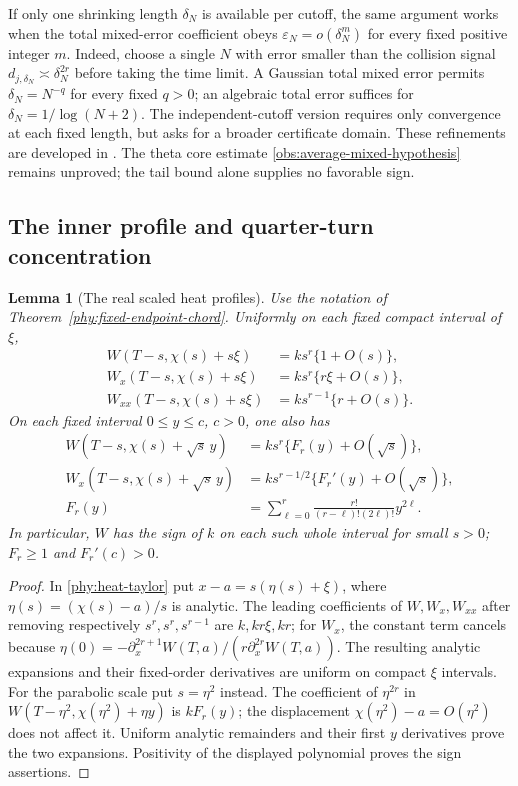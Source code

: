 \documentclass[11pt]{article}
\numberwithin{equation}{section}
\newtheorem{lemma}[theorem]{Lemma}
\theoremstyle{definition}
\theoremstyle{remark}
\begin{document}
If only one shrinking length $\delta_N$ is available per cutoff,
the same argument works when the total mixed-error coefficient obeys
$\varepsilon_N=o(\delta_N^m)$ for every fixed positive integer $m$.
Indeed, choose a single $N$ with error smaller than the collision
signal $d_{j,\delta_N}\asymp\delta_N^{2r}$ before taking the time
limit.  A Gaussian total mixed error permits $\delta_N=N^{-q}$ for
every fixed $q>0$; an algebraic total error suffices for
$\delta_N=1/\log(N+2)$.
The independent-cutoff version requires only convergence at each
fixed length, but asks for a broader certificate domain.
These refinements are developed in
\cite{ThetaFactorChord,ThetaExponential,ThetaResearchPaths}.
The theta core estimate \eqref{obs:average-mixed-hypothesis} remains
unproved; the tail bound alone supplies no favorable sign.

\subsection{The inner profile and quarter-turn concentration}

\begin{lemma}[The real scaled heat profiles]
\label{phy:scaled-profile}
Use the notation of Theorem~\ref{phy:fixed-endpoint-chord}.  Uniformly
on each fixed compact interval of $\xi$,
\begin{align}
 W(T-s,\chi(s)+s\xi)&=ks^r\{1+O(s)\},\nonumber\\
 W_x(T-s,\chi(s)+s\xi)&=ks^r\{r\xi+O(s)\},\nonumber\\
 W_{xx}(T-s,\chi(s)+s\xi)&=ks^{r-1}\{r+O(s)\}.
 \label{phy:inner-jet-profile}
\end{align}
On each fixed interval $0\le y\le c$, $c>0$, one also has
\begin{align}
 W(T-s,\chi(s)+\sqrt{s}\,y)
 &=ks^r\{F_r(y)+O(\sqrt{s})\},\label{phy:scaled-W}\\
 W_x(T-s,\chi(s)+\sqrt{s}\,y)
 &=ks^{r-1/2}\{F_r'(y)+O(\sqrt{s})\},\label{phy:scaled-Wx}\\
 F_r(y)&=\sum_{\ell=0}^r
       \frac{r!}{(r-\ell)!(2\ell)!}y^{2\ell}.
 \label{phy:profile-polynomial}
\end{align}
In particular, $W$ has the sign of $k$ on each such whole interval
for small $s>0$; $F_r\ge1$ and $F_r'(c)>0$.
\end{lemma}
\begin{proof}
In \eqref{phy:heat-taylor} put
$x-a=s(\eta(s)+\xi)$, where $\eta(s)=(\chi(s)-a)/s$ is analytic.
The leading coefficients of $W,W_x,W_{xx}$ after removing respectively
$s^r,s^r,s^{r-1}$ are $k,kr\xi,kr$; for $W_x$, the constant term
cancels because
$\eta(0)=-\partial_x^{2r+1}W(T,a)/(r\partial_x^{2r}W(T,a))$.
The resulting analytic expansions and their fixed-order derivatives
are uniform on compact $\xi$ intervals.  For the parabolic scale put
$s=\eta^2$ instead.  The coefficient of $\eta^{2r}$ in
$W(T-\eta^2,\chi(\eta^2)+\eta y)$ is $kF_r(y)$; the displacement
$\chi(\eta^2)-a=O(\eta^2)$ does not affect it.  Uniform analytic
remainders and their first $y$ derivatives prove the two expansions.
Positivity of the displayed polynomial proves the sign assertions.
\end{proof}
\end{document}
